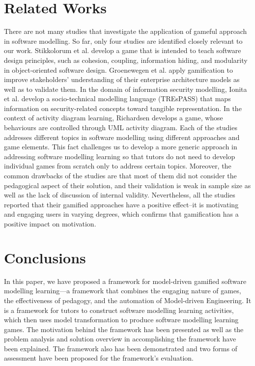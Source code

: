 \documentclass[conference]{IEEEtran}
\begin{document}
\section{Related Works}
\label{Related Works}
There are not many studies that investigate the application of gameful approach in software modelling. So far, only four studies are identified closely relevant to our work. Stikkolorum et al. \cite{Stikkolorum2014} develop a game that is intended to teach software design principles, such as cohesion, coupling, information hiding, and modularity in object-oriented software design. Groenewegen et al. \cite{Groenewegen2010} apply gamification to improve stakeholders' understanding of their enterprise architecture models as well as to validate them. In the domain of information security modelling, Ionita et al.\cite{Ionita2015} develop a socio-technical modelling language (TREsPASS) that maps information on security-related concepts toward tangible representation. In the context of activity diagram learning, Richardsen \cite{Richardsen2014} develops a game, whose behaviours are controlled through UML activity diagram. Each of the studies addresses different topics in software modelling using different approaches and game elements. This fact challenges us to develop a more generic approach in addressing software modelling learning so that tutors do not need to develop individual games from scratch only to address certain topics. Moreover, the common drawbacks of the studies are that most of them did not consider the pedagogical aspect of their solution, and their validation is weak in sample size as well as the lack of discussion of internal validity. Nevertheless, all the studies reported that their gamified approaches have a positive effect--it is motivating and engaging users in varying degrees, which confirms that gamification has a positive impact on motivation.

\section{Conclusions}
\label{Conclusions}
In this paper, we have proposed a framework for model-driven gamified software modelling learning---a framework that combines the engaging nature of games, the effectiveness of pedagogy, and the automation of Model-driven Engineering. It is a framework for tutors to construct software modelling learning activities, which then uses model transformation to produce software modelling learning games. The motivation behind the framework has been presented as well as the problem analysis and solution overview in accomplishing the framework have been explained. The framework also has been demonstrated and two forms of assessment have been proposed for the framework's evaluation.
\end{document}
